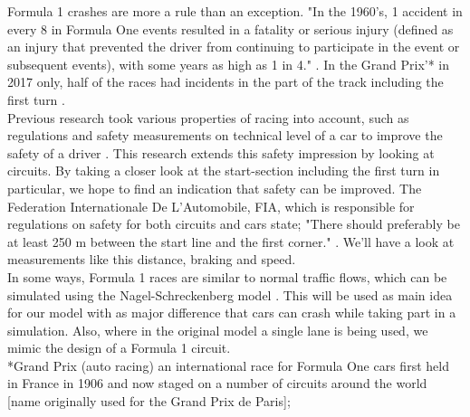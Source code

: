 Formula 1 crashes are more a rule than an exception. "In the 1960’s, 1 accident in every 8 in Formula One events resulted in a fatality or serious injury (defined as an injury that prevented the driver from continuing to participate in the event or subsequent events), with some years as high as 1 in 4." \cite{motorsports-safety}. In the Grand Prix'* in 2017 only, half of the races had incidents in the part of the track including the first turn \cite{incidents}.\\
Previous research took various properties of racing into account, such as regulations and safety measurements on technical level of a car to improve the safety of a driver \cite{safety-review}. This research extends this safety impression by looking at circuits. By taking a closer look at the start-section including the first turn in particular, we hope to find an indication that safety can be improved. The Federation Internationale De L'Automobile, FIA, which is responsible for regulations on safety for both circuits and cars state; "There should preferably be at least 250 m between the start line and the first corner." \cite{fia-starting-straight}. We'll have a look at measurements like this distance, braking and speed.\\
In some ways, Formula 1 races are similar to normal traffic flows, which can be simulated using the Nagel-Schreckenberg model \cite{nagel-schreckenberg}. This will be used as main idea for our model with as major difference that cars can crash while taking part in a simulation. Also, where in the original model a single lane is being used, we mimic the design of a Formula 1 circuit.\\

*Grand Prix (auto racing) an international race for Formula One cars first held in France in 1906 and now staged on a number of circuits around the world [name originally used for the Grand Prix de Paris];\cite{grand-prix}\\
